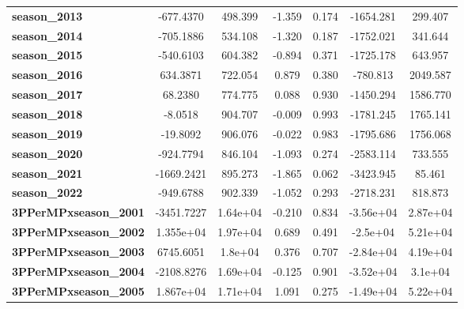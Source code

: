 \begin{center}
\begin{tabular}{lcccccc}
\textbf{season\_2013}         &    -677.4370  &      498.399     &    -1.359  &         0.174        &    -1654.281    &      299.407     \\
\textbf{season\_2014}         &    -705.1886  &      534.108     &    -1.320  &         0.187        &    -1752.021    &      341.644     \\
\textbf{season\_2015}         &    -540.6103  &      604.382     &    -0.894  &         0.371        &    -1725.178    &      643.957     \\
\textbf{season\_2016}         &     634.3871  &      722.054     &     0.879  &         0.380        &     -780.813    &     2049.587     \\
\textbf{season\_2017}         &      68.2380  &      774.775     &     0.088  &         0.930        &    -1450.294    &     1586.770     \\
\textbf{season\_2018}         &      -8.0518  &      904.707     &    -0.009  &         0.993        &    -1781.245    &     1765.141     \\
\textbf{season\_2019}         &     -19.8092  &      906.076     &    -0.022  &         0.983        &    -1795.686    &     1756.068     \\
\textbf{season\_2020}         &    -924.7794  &      846.104     &    -1.093  &         0.274        &    -2583.114    &      733.555     \\
\textbf{season\_2021}         &   -1669.2421  &      895.273     &    -1.865  &         0.062        &    -3423.945    &       85.461     \\
\textbf{season\_2022}         &    -949.6788  &      902.339     &    -1.052  &         0.293        &    -2718.231    &      818.873     \\
\textbf{3PPerMPxseason\_2001} &   -3451.7227  &     1.64e+04     &    -0.210  &         0.834        &    -3.56e+04    &     2.87e+04     \\
\textbf{3PPerMPxseason\_2002} &    1.355e+04  &     1.97e+04     &     0.689  &         0.491        &     -2.5e+04    &     5.21e+04     \\
\textbf{3PPerMPxseason\_2003} &    6745.6051  &      1.8e+04     &     0.376  &         0.707        &    -2.84e+04    &     4.19e+04     \\
\textbf{3PPerMPxseason\_2004} &   -2108.8276  &     1.69e+04     &    -0.125  &         0.901        &    -3.52e+04    &      3.1e+04     \\
\textbf{3PPerMPxseason\_2005} &    1.867e+04  &     1.71e+04     &     1.091  &         0.275        &    -1.49e+04    &     5.22e+04     \\

\end{tabular}
\end{center}
